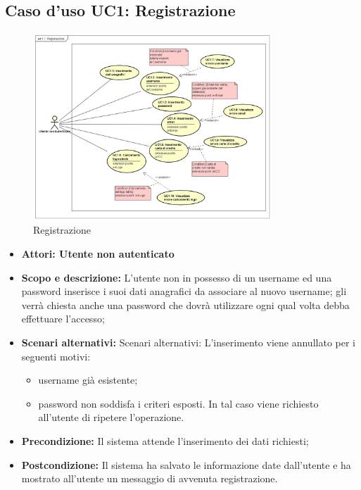 \documentclass[12pt,a4paper,titlepage]{article}
\begin{document}
	\subsection{Caso d'uso UC1: Registrazione}
	\label{UC1}
	\begin{figure}[ht]
		\centering
		\includegraphics[width=0.8\textwidth]{UseCase/Registrazione}
		\caption{Registrazione}
	\end{figure}
	\begin{itemize}
		\item \textbf{Attori: Utente non autenticato}
		\item \textbf{Scopo e descrizione:} L'utente non in possesso di un username ed una password inserisce i suoi dati anagrafici da associare al nuovo username; gli verrà chiesta anche una password che dovrà utilizzare ogni qual volta debba effettuare l'accesso;
		\item \textbf{Scenari alternativi:} Scenari alternativi: L'inserimento viene annullato per i seguenti motivi:
		\begin{itemize}
			\item username già esistente;
			\item password non soddisfa i criteri esposti. In tal caso viene richiesto all'utente di ripetere l'operazione.
		\end{itemize}
		\item \textbf{Precondizione:} Il sistema attende l'inserimento dei dati richiesti;
		\item \textbf{Postcondizione:} Il sistema ha salvato le informazione date dall'utente e ha mostrato all'utente un messaggio di avvenuta registrazione.
	\end{itemize}
\end{document}
